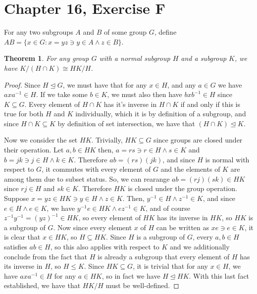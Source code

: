 \documentclass[12pt]{article}
\newtheorem{thm}{Theorem}
\begin{document}
\section{Chapter 16, Exercise F}

For any two subgroups $A$ and $B$ of some group $G$,
define $AB = \{x \in G: x = yz \ni y \in A \land z \in B \}$.

\begin{thm} \label{thm9}
	For any group $G$ with a normal subgroup $H$ and a subgroup $K$,
	we have $K/(H \cap K) \cong HK/H$.
\end{thm}

\begin{proof}
	Since $H \trianglelefteq G$,
	we must have that for any $x \in H$,
	and any $a \in G$
	we have $axa^{-1} \in H$.
	If we take some $b \in K$,
	we must also then have $bxb^{-1} \in H$
	since $K \subseteq G$.
	Every element of $H \cap K$ has it's inverse
	in  $H \cap K$ if and only if this is true
	for both $H$ and $K$ individually,
	which it is by definition of a subgroup,
	and since $H \cap K \subseteq K$ by definition of set intersection,
	we have that $(H \cap K) \trianglelefteq K$.

	Now we consider the set $HK$.
	Trivially, $HK \subseteq G$ since groups are closed under their operation.
	Let $a,b \in HK$ then, $a = rs \ni r \in H \land s \in K$
	and $b = jk \ni j \in H \land k \in K$.
	Therefore $ab = (rs)(jk)$, and since $H$ is normal with respect to $G$,
	it commutes with every element of $G$ and the elements of $K$ are among them
	due to subset status. So, we can rearange $ab = (rj)(sk) \in HK$
	since $rj \in H$ and $sk \in K$. Therefore $HK$ is closed under the group operation.
	Suppose $x = yz \in HK \ni y \in H \land z \in K$.
	Then, $y^{-1} \in H \land z^{-1} \in K$,
	and since $e \in H \land e \in K$, we have $y^{-1}e \in HK \land ez^{-1} \in K$,
	and of course $z^{-1}y^{-1} = (yz)^{-1} \in HK$, so every element of $HK$
	has its inverse in $HK$, so $HK$ is a subgroup of $G$.
	Now since every element $x$ of $H$ can be written as $xe \ni e \in K$,
	it is clear that $x \in HK$, so $H \subseteq HK$.
	Since $H$ is a subgroup of $G$, every $a,b \in H$ satisfies $ab \in H$,
	so this also applies with respect to $K$ and we additionally conclude
	from the fact that $H$ is already a subgroup that every element of $H$
	has its inverse in $H$, so $H \leq K$.
	Since $HK \subseteq G$, it is trivial that for any $x \in H$,
	we have $axa^{-1} \in H$ for any $a \in HK$,
	so in fact we have $H \trianglelefteq HK$.
	With this last fact established,
	we have that $HK/H$ must be well-defined.


\end{proof}
\end{document}
